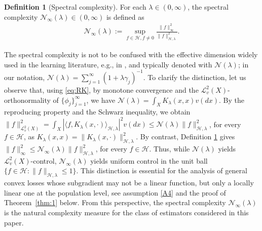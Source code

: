 \documentclass[11pt]{article}
\theoremstyle{definition}
\newtheorem{definition}{Definition}
\theoremstyle{remark}
\begin{document}
\begin{definition}[Spectral complexity]
\label{def:1} For each $\lambda \in (0,\infty)$, the spectral complexity $\mathcal{N}_{\infty}(\lambda) \in (0,\infty)$ is defined as
\begin{align*}
\mathcal{N}_{\infty}(\lambda) := \sup_{f \in \mathcal{H}, f \neq 0} \frac{\|f\|^2_{\infty}}{\|f\|_{\mathcal{H},\lambda}^2}.
\end{align*}
\end{definition}
\noindent
The spectral complexity is not to be confused with the effective dimension widely used in the learning literature, e.g., in \citep{Fischer:2020}, and typically denoted with $\mathcal{N}(\lambda)$; in our notation, $\mathcal{N}(\lambda) = \sum_{j=1}^{\infty} (1+\lambda \gamma_j)^{-1}$. To clarify the distinction,  let us observe that, using \eqref{eq:RK}, by monotone convergence and the $\mathcal{L}^2_v(X)$-orthonormality of $\{\phi_j\}_{j=1}^{\infty}$, we have $\mathcal{N}(\lambda) = \int_{X} K_{\lambda}(x,x) v(dx)$. By the reproducing property and the Schwarz inequality, we obtain $\|f\|_{\mathcal{L}^2_v(X)}^2 = \int_{X} |\langle f, K_{\lambda}(x,\cdot) \rangle_{\mathcal{H},\lambda}|^2 v(dx) \leq \mathcal{N}(\lambda) \|f\|_{\mathcal{H},\lambda}^2$, for every $f \in \mathcal{H}$, as $K_{\lambda}(x,x) = \|K_{\lambda}(x,\cdot)\|_{\mathcal{H},\lambda}^2$. By contrast, Definition \ref{def:1} gives $\|f\|_{\infty}^2\leq \mathcal{N}_{\infty}(\lambda) \|f\|_{\mathcal{H},\lambda}^2$, for every $f \in \mathcal{H}$. Thus, while $\mathcal{N}(\lambda)$ yields $\mathcal{L}_v^2(X)$-control, $\mathcal{N}_{\infty}(\lambda)$ yields uniform control in the unit ball $\{f \in \mathcal{H}: \|f\|_{\mathcal{H},\lambda} \leq 1 \}$. This distinction is essential for the analysis of general convex losses whose subgradient may not be a linear function, but only a locally linear one at the population level, see assumption \ref{A4} and the proof of Theorem~\ref{thm:1} below. From this perspective, the spectral complexity $\mathcal{N}_{\infty}(\lambda)$ is the natural complexity measure for the class of estimators considered in this paper.
\end{document}
